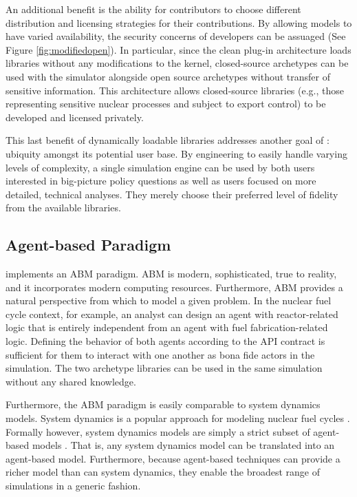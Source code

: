 An additional benefit is the ability for
contributors to choose different distribution and licensing strategies
for their contributions. By allowing models to have varied
availability, the security concerns of developers can be
assuaged (See Figure \ref{fig:modifiedopen}).
In particular, since the clean plug-in architecture loads libraries without any
modifications to the \Cyclus kernel, closed-source archetypes can be used with
the simulator alongside open source archetypes without transfer of sensitive information. This architecture
allows closed-source libraries (e.g., those representing sensitive nuclear
processes and subject to export control) to be developed and licensed privately.

This last benefit of dynamically loadable libraries addresses
another goal of \Cyclus: ubiquity amongst its potential user base. By
engineering \Cyclus to easily handle varying levels of complexity, a single
simulation engine can be used by both users interested in big-picture policy
questions as well as users focused on more detailed, technical
analyses. They merely choose their preferred level of fidelity from the 
available libraries. 

\subsection{Agent-based Paradigm}

\Cyclus implements an \acrlong{ABM} paradigm.  \gls{ABM} is modern, sophisticated, 
true to reality, and it incorporates modern computing resources.  
Furthermore, \gls{ABM} provides a natural 
perspective from which to model a given problem. In the nuclear fuel cycle 
context, for example, an analyst can design an agent with reactor-related logic 
that is entirely independent from an agent with fuel fabrication-related 
logic. Defining the behavior of both agents according to the 
\gls{API} contract is sufficient for them to interact with one another as 
bona fide actors in the simulation.  The two archetype libraries can be used in the same
simulation without any shared knowledge.

Furthermore, the \gls{ABM} paradigm is easily comparable to system dynamics models.
System dynamics is a popular approach for modeling nuclear fuel cycles 
\cite{jacobson_vision_2009,van_den_durpel_daness_2009,guerin_impact_2009,guerin_benchmark_2009}. 
Formally however, system dynamics models are simply a strict subset of agent-based models
\cite{macal_agent-based_2010}.
That is, any system dynamics model can be translated
into an agent-based model. Furthermore, because agent-based
techniques can provide a richer model than can system dynamics, they enable the 
broadest range of simulations in a generic fashion.


